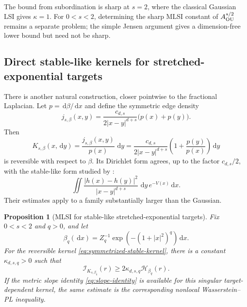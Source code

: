 \documentclass[11pt]{article}
\newtheorem{proposition}[theorem]{Proposition}
\theoremstyle{definition}
\newcommand{\dd}{\,\mathrm d}
\newcommand{\cI}{\mathcal I}
\newcommand{\cH}{\mathcal H}
\newcommand{\abs}[1]{\left\lvert #1\right\rvert}
\begin{document}
The bound from subordination is sharp at $s=2$, where the classical Gaussian
LSI gives $\kappa=1$.  For $0<s<2$, determining the sharp MLSI constant of
$A_{\rm OU}^{s/2}$ remains a separate problem; the simple Jensen argument
gives a dimension-free lower bound but need not be sharp.

\subsection{Direct stable-like kernels for stretched-exponential targets}

There is another natural construction, closer pointwise to the fractional
Laplacian.  Let $p=\dd\beta/\dd x$ and define the symmetric edge density
\begin{equation}\label{eq:symmetrized-stable-edge}
  j_{s,\beta}(x,y)
  =\frac{c_{d,s}}{2\abs{x-y}^{d+s}}\bigl(p(x)+p(y)\bigr).
\end{equation}
Then
\begin{equation}\label{eq:symmetrized-stable-kernel}
  K_{s,\beta}(x,\dd y)
  =\frac{j_{s,\beta}(x,y)}{p(x)}\,\dd y
  =\frac{c_{d,s}}{2\abs{x-y}^{d+s}}
   \left(1+\frac{p(y)}{p(x)}\right)\dd y
\end{equation}
is reversible with respect to $\beta$.  Its Dirichlet form agrees, up to the
factor $c_{d,s}/2$, with the stable-like form studied by
\citet{WangWang2015StableLike}:
\[
  \iint\frac{\abs{h(x)-h(y)}^2}{\abs{x-y}^{d+s}}
  \,\dd y\,e^{-V(x)}\dd x.
\]
Their estimates apply to a family substantially larger than the Gaussian.

\begin{proposition}[MLSI for stable-like stretched-exponential targets]
\label{prop:stable-like-stretched-exponential}
Fix $0<s<2$ and $q>0$, and let
\begin{equation}\label{eq:stretched-exponential-target}
  \beta_q(\dd x)=Z_q^{-1}
    \exp\!\left(-(1+\abs x^2)^q\right)\dd x.
\end{equation}
For the reversible kernel \eqref{eq:symmetrized-stable-kernel}, there is a
constant $\kappa_{d,s,q}>0$ such that
\begin{equation}\label{eq:stable-like-stretched-mlsi}
  \cI_{K_{s,\beta_q}}(r)
  \geq2\kappa_{d,s,q}\cH_{\beta_q}(r).
\end{equation}
If the metric slope identity \eqref{eq:slope-identity} is available for this
singular target-dependent kernel, the same estimate is the corresponding
nonlocal Wasserstein--PL inequality.
\end{proposition}
\end{document}
